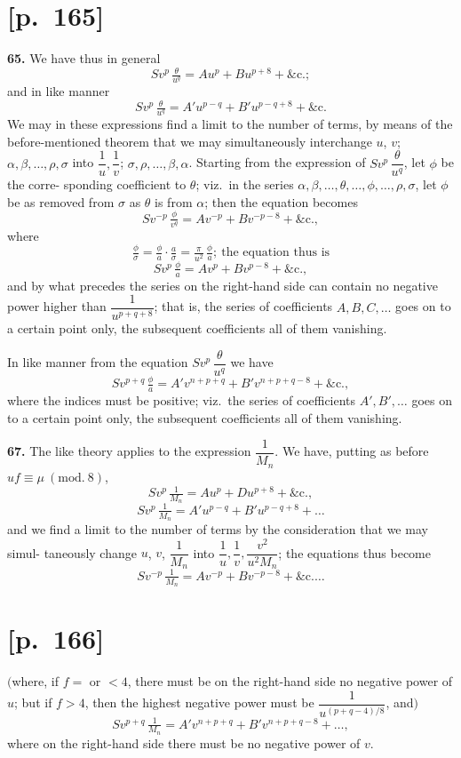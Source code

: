 \documentclass[11pt]{article}
\providecommand{\modd}{\mathrm{mod}}
\begin{document}
\section*{[p.~165]}

\noindent\textbf{65.} We have thus in general
\[
S v^p\,\tfrac{\theta}{u^q}=Au^p+Bu^{p+8}+\&\text{c.};
\]
and in like manner
\[
S v^{p}\,\tfrac{\theta}{u^q}=A'u^{p-q}+B'u^{p-q+8}+\&\text{c.}
\]
We may in these expressions find a limit to the number of terms, by means of the
before-mentioned theorem that we may simultaneously interchange $u$, $v$; $\alpha,\beta,\ldots,\rho,\sigma$
into $\dfrac{1}{u},\dfrac{1}{v}$; $\sigma,\rho,\ldots,\beta,\alpha$. Starting from the expression of $S v^p\,\dfrac{\theta}{u^q}$, let $\phi$ be the corre-
sponding coefficient to $\theta$; viz.\ in the series $\alpha,\beta,\ldots,\theta,\ldots,\phi,\ldots,\rho,\sigma$, let $\phi$ be as removed
from $\sigma$ as $\theta$ is from $\alpha$; then the equation becomes
\[
S v^{-p}\,\tfrac{\phi}{v^q}=Av^{-p}+Bv^{-p-8}+\&\text{c.},
\]
where
\[
\tfrac{\phi}{\sigma}=\tfrac{\phi}{a}\cdot\tfrac{a}{\sigma}=\tfrac{\pi}{u^2}\,\tfrac{\phi}{a};\ \text{the equation thus is}
\]
\[
S v^p\,\tfrac{\phi}{a}=Av^p+Bv^{p-8}+\&\text{c.},
\]
and by what precedes the series on the right-hand side can contain no negative power
higher than $\dfrac{1}{u^{p+q+8}}$; that is, the series of coefficients $A,B,C,\ldots$ goes on to a certain
point only, the subsequent coefficients all of them vanishing.

In like manner from the equation $S v^p\,\dfrac{\theta}{u^q}$ we have
\[
S v^{p+q}\,\tfrac{\phi}{a}=A'v^{n+p+q}+B'v^{n+p+q-8}+\&\text{c.},
\]
where the indices must be positive; viz.\ the series of coefficients $A',B',\ldots$ goes on
to a certain point only, the subsequent coefficients all of them vanishing.

\medskip
\noindent\textbf{67.} The like theory applies to the expression $\dfrac{1}{M_n}$. We have, putting as before
$uf\equiv\mu\ (\modd.\ 8)$,
\[
S v^p\,\tfrac{1}{M_n}=Au^p+Du^{p+8}+\&\text{c.},
\]
\[
S v^{p}\,\tfrac{1}{M_n}=A'u^{p-q}+B'u^{p-q+8}+\ldots
\]
and we find a limit to the number of terms by the consideration that we may simul-
taneously change $u$, $v$, $\dfrac{1}{M_n}$ into $\dfrac{1}{u},\dfrac{1}{v},\dfrac{v^2}{u^2 M_n}$; the equations thus become
\[
S v^{-p}\,\tfrac{1}{M_n}=A v^{-p}+B v^{-p-8}+\&\text{c.}\ldots
\]

\section*{[p.~166]}
\noindent$\Big($where, if $f=$ or $<4$, there must be on the right-hand side no negative power of $u$;
but if $f>4$, then the highest negative power must be $\dfrac{1}{u^{(p+q-4)/8}}$, and$\Big)$
\[
S v^{p+q}\,\tfrac{1}{M_n}=A'v^{n+p+q}+B'v^{n+p+q-8}+\ldots,
\]
where on the right-hand side there must be no negative power of $v$.
\end{document}
